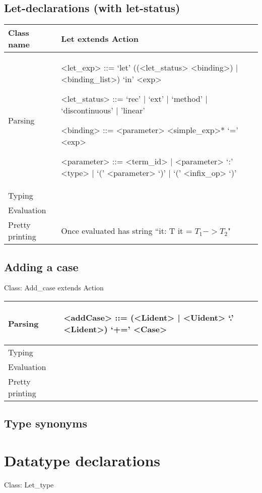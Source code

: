 \documentclass[12pt]{article}
\begin{document}
\subsection{Let-declarations (with let-status) }
\begin{tabular}{|l|p{15cm}|}
\hline
\hline
Class name & Let extends Action \\
\hline
Parsing & 
\begin{grammar}
<let_exp> ::= `let' ((<let_status>  <binding>) | <binding_list>) `in' <exp>

<let_status> ::= `rec' | `ext' | `method' | `discontinuous' | 'linear'

<binding> ::= <parameter> <simple_exp>* `=' <exp>

<parameter> ::= <term_id> | <parameter> `:' <type> | `(' <parameter> `)' | `(' <infix_op> `)' 
\end{grammar}
 \\
\hline
Typing & \\
\hline
Evaluation &  \\
\hline
Pretty printing &  Once evaluated  has string  ``it: T it = $T_1 -> T_2$" \\
\hline
\end{tabular} 
\subsection{Adding a case}
Class: Add_case extends Action

\begin{tabular}{|l|p{15cm}|}
\hline
Parsing & \begin{grammar}
<addCase> ::=  (<Lident> | <Uident> `.' <Lident>) `+=' <Case>   
\end{grammar}  \\
\hline
Typing & 
\\
\hline
Evaluation &  \\
\hline
Pretty printing &  \\
\hline
\end{tabular} 
\subsection{Type synonyms}
\section{Datatype declarations}
Class: Let_type
\end{document}
